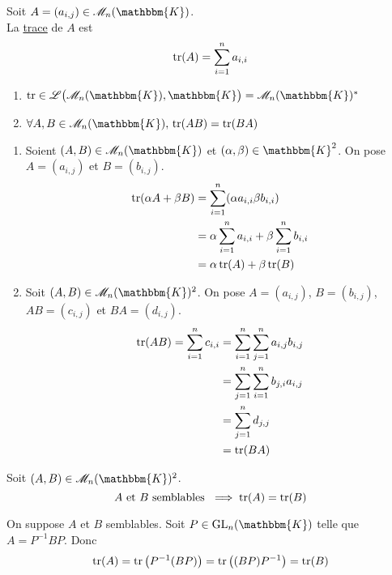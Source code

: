 \begin{defn}
	Soit $A = (a_{i,j}) \in \mathcal{M}_n(\mathbbm{K})$.\\
	La \underline{trace} de $A$ est \[
		\operatorname{tr}(A) = \sum_{i=1}^n a_{i,i}
	\]
\end{defn}

\begin{prop}
	\begin{enumerate}
		\item $\tr \in \mathcal{L}\big(\mathcal{M}_n(\mathbbm{K}), \mathbbm{K}\big) = \mathcal{M}_n(\mathbbm{K})^*$
		\item $\forall A,B \in \mathcal{M}_n(\mathbbm{K}),\, \tr(AB) = \tr(BA)$
	\end{enumerate}
\end{prop}

\begin{prv}
	\begin{enumerate}
		\item Soient $(A,B) \in \mathcal{M}_n(\mathbbm{K})$ et $(\alpha, \beta) \in \mathbbm{K}^2$. On pose $A = (a_{i,j})$ et $B = (b_{i,j})$.
			\begin{align*}
				\operatorname{tr}(\alpha A + \beta B) &= \sum_{i=1}^n (\alpha a_{i,i} \beta b_{i,i}) \\
				&= \alpha \sum_{i=1}^n a_{i,i} + \beta \sum_{i=1}^n b_{i,i} \\
				&= \alpha \operatorname{tr}(A) + \beta \operatorname{tr}(B) \\
			\end{align*}
		\item Soit $(A,B) \in \mathcal{M}_n(\mathbbm{K})^2$. On pose $A = (a_{i,j})$, $B = (b_{i,j})$, $AB = (c_{i,j})$ et $BA = (d_{i,j})$.
			\begin{align*}
				\operatorname{tr}(AB) = \sum_{i=1}^n c_{i,i} &= \sum_{i=1}^n \sum_{j=1}^n a_{i,j} b_{i,j} \\
				&= \sum_{j=1}^n \sum_{i=1}^n b_{j,i}a_{i,j} \\
				&= \sum_{j=1}^n d_{j,j} \\
				&= \operatorname{tr}(BA) \\
			\end{align*}
	\end{enumerate}
\end{prv}

\begin{prop}
	Soit $(A,B) \in \mathcal{M}_n(\mathbbm{K})^2$. \[
		A \text{ et } B \text{ semblables } \implies \operatorname{tr}(A) = \operatorname{tr}(B)
	\]
\end{prop}

\begin{prv}
	On suppose $A$ et $B$ semblables. Soit $P \in \mathrm{GL}_n(\mathbbm{K})$ telle que $A = P^{-1}BP$. Donc \[
		\operatorname{tr}(A) = \operatorname{tr}\big(P^{-1}(BP)\big) = \operatorname{tr}\big((BP)P^{-1}\big) = \operatorname{tr}(B)
	\]
\end{prv}

